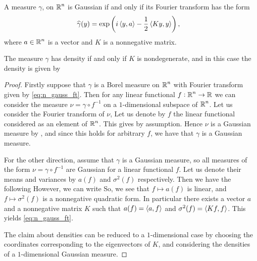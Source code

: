 \documentclass[../main.tex]{subfiles}
\begin{document}
\begin{proposition}
\label{prop:n_gauss_ft}
A measure $\gamma$, on $\operatorname{\mathbb{R}}^n$ is Gaussian if and only if its Fourier transform has the form
\begin{equation}
    \label{eq:n_gauss_ft}
    \widehat{\gamma}(y) = \exp\left( i\left\langle y,a \right\rangle - \frac12\left\langle Ky,y \right\rangle \right),
\end{equation}
where $a\in\operatorname{\mathbb{R}}^n$ is a vector and $K$ is a nonnegative matrix.

The measure $\gamma$ has density if and only if $K$ is nondegenerate, and in this case the density is given by 
\end{proposition}
\begin{proof}
Firstly suppose that $\gamma$ is a Borel measure on $\operatorname{\mathbb{R}}^n$ with Fourier transform given by \eqref{eq:n_gauss_ft}. Then for any linear functional $f:\operatorname{\mathbb{R}}^n\to\operatorname{\mathbb{R}}$ we can consider the measure $\nu = \gamma\circ f^{-1}$ on a $1$-dimensional subspace of $\operatorname{\mathbb{R}}^n$. Let us consider the Fourier transform of $\nu$,
 Let us denote by $f$ the linear functional considered as an element of $\operatorname{\mathbb{R}}^n$. This gives  by assumption. Hence $\nu$ is a Gaussian measure by , and since this holds for arbitrary $f$, we have that $\gamma$ is a Gaussian measure.

For the other direction, assume that $\gamma$ is a Gaussian measure, so all measures of the form $\nu = \gamma\circ f^{-1}$ are Gaussian for a linear functional $f$. Let us denote their means and variances by $a(f)$ and $\sigma^2(f)$ respectively. Then we have the following  However, we can write
 So, we see that $f\mapsto a(f)$ is linear, and $f\mapsto\sigma^2(f)$ is a nonnegative quadratic form. In particular there exists a vector $a$ and a nonnegative matrix $K$ such that $a(f) = \left\langle a,f \right\rangle$ and $\sigma^2(f) = \left\langle Kf,f \right\rangle$. This yields \eqref{eq:n_gauss_ft}.

The claim about densities can be reduced to a $1$-dimensional case by choosing the coordinates corresponding to the eigenvectors of $K$, and considering the densities of a $1$-dimensional Gaussian measure.
\end{proof}
\end{document}
